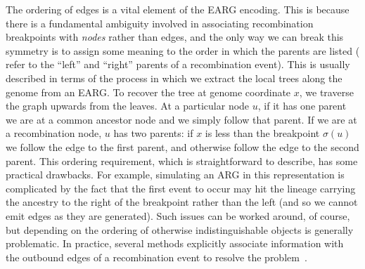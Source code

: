 \documentclass{article}
\begin{document}

The ordering of edges is a vital element of the EARG encoding.
This is because there is a fundamental ambiguity involved
in associating recombination breakpoints with \emph{nodes}
rather than edges,
and the only way we can break this symmetry is to assign
some meaning to the order in which the parents are listed
(\cite{griffiths1997ancestral} refer to the ``left'' and ``right''
parents of a recombination event). This is usually described
in terms of the process in which we extract the local trees
along the genome from an EARG.
To recover
the tree at genome coordinate $x$,
we traverse the graph upwards from the leaves. At a particular
node $u$, if it has one parent we are at a common ancestor
node and we simply follow that parent. If we are at a
recombination node, $u$ has two parents: if
$x$ is less than the breakpoint $\sigma(u)$ we follow
the edge to the first parent, and otherwise follow the edge
to the second parent.
This ordering requirement, which is straightforward
to describe, has some practical drawbacks. For example,
simulating an ARG in this representation is
complicated by the fact that the
first event to occur may hit the lineage carrying the ancestry
to the right of the breakpoint rather
than the left (and so we cannot emit edges as they are generated).
Such issues can be worked around, of course,
but depending on the ordering of otherwise indistinguishable
objects is generally problematic. In practice, several
methods
explicitly associate information with the outbound edges
of a recombination event
to resolve the problem~\citep{lyngso2005minimum,ignatieva2021kwarg}.
\end{document}
